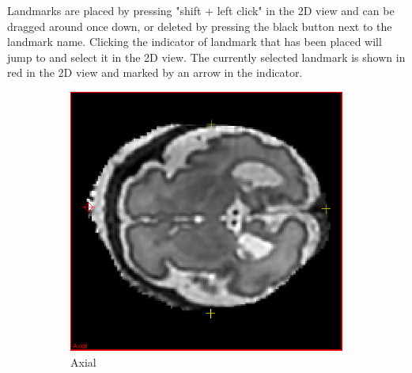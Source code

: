 Landmarks are placed by pressing "shift + left click" in the 2D view and can be dragged around once down, or deleted by pressing the black button next to the landmark name. Clicking the indicator of landmark that has been placed will jump to and select it in the 2D view. The currently selected landmark is shown in red in the 2D view and marked by an arrow in the indicator.

\begin{figure}[H]
  \centering
  \begin{subfigure}[b]{0.559\textwidth}
    \includegraphics[width=\textwidth]{images/reconstruction/axial.png}
    \caption*{Axial}
    \label{fig:reconstructionaxial}
  \end{subfigure}%
  \begin{subfigure}[b]{0.441\textwidth}

\end{subfigure}
\end{figure}
